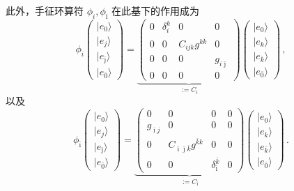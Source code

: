 此外，手征环算符 $\phi_i,\phi_{\bar\imath}$ 在此基下的作用成为
\begin{equation}
  \phi_i
  \begin{pmatrix}
    |e_0\rangle\\ |e_j\rangle\\ |e_{\bar\jmath}\rangle\\ |e_{\bar 0}\rangle
  \end{pmatrix}
  =
  \underbrace{
  \begin{pmatrix}
    0 & \delta^k_i & 0 & 0\\
    0 & 0 & C_{ijk}g^{k\bar k} & 0\\
    0 & 0 & 0 & g_{i\bar\jmath}\\
    0 & 0 & 0 & 0
  \end{pmatrix}}_{:=C_i}
  \begin{pmatrix}
    |e_0\rangle\\ |e_k\rangle\\ |e_{\bar k}\rangle\\ |e_{\bar 0}\rangle
  \end{pmatrix}\,,
  \tag{4.5}
  \label{eq:4.5}
\end{equation}
以及
\begin{equation}
  \phi_{\bar\imath}
  \begin{pmatrix}
    |e_0\rangle\\ |e_j\rangle\\ |e_{\bar\jmath}\rangle\\ |e_{\bar 0}\rangle
  \end{pmatrix}
  =
  \underbrace{
  \begin{pmatrix}
    0 & 0 & 0 & 0\\
    g_{\bar\imath j} & 0 & 0 & 0\\
    0 & C_{\bar\imath\bar\jmath\bar k}g^{\bar k k} & 0 & 0\\
    0 & 0 & \delta^{\bar k}_{\bar\imath} & 0
  \end{pmatrix}}_{:=C_{\bar\imath}}
  \begin{pmatrix}
    |e_0\rangle\\ |e_k\rangle\\ |e_{\bar k}\rangle\\ |e_{\bar 0}\rangle
  \end{pmatrix}\,.
  \tag{4.6}
  \label{eq:4.6}
\end{equation}

